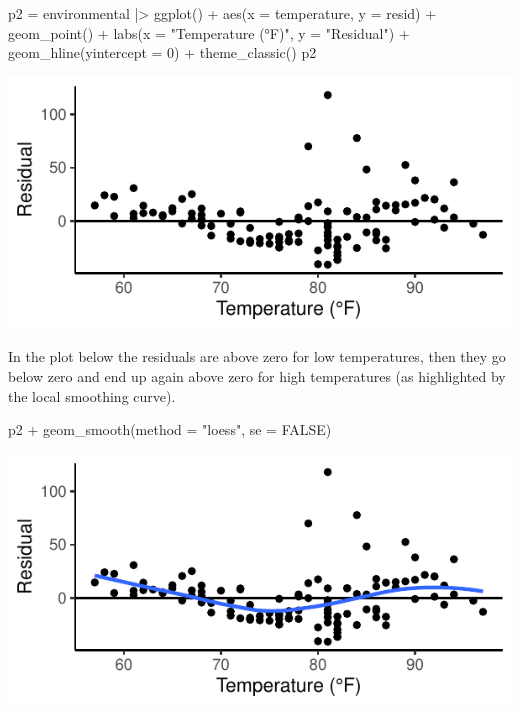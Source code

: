 \documentclass[a4paper]{article}\usepackage[]{graphicx}\usepackage[]{xcolor}
\makeatletter
\def\maxwidth{ %
  \ifdim\Gin@nat@width>\linewidth
    \linewidth
  \else
    \Gin@nat@width
  \fi
}
\makeatother
\begin{document}
\hspace{0.02\textwidth}
\begin{minipage}[t]{0.49\textwidth}
\begin{Schunk}
\begin{Sinput}
p2 = environmental |> ggplot() + 
  aes(x = temperature, y = resid) + 
  geom_point() + 
  labs(x = "Temperature (°F)",
       y = "Residual") +
  geom_hline(yintercept = 0) +
  theme_classic()
p2
\end{Sinput}


{\centering \includegraphics[width=\maxwidth]{figure/listings-unnamed-chunk-344-1} 

}

\end{Schunk}
\end{minipage}
In the plot below the residuals are above zero for low temperatures, then they go below zero and end up again above zero for high temperatures (as highlighted by the local smoothing curve).\\
\begin{minipage}[m]{0.49\textwidth}
\begin{Schunk}
\begin{Sinput}
p2 + geom_smooth(method = "loess", 
                 se = FALSE)
\end{Sinput}


{\centering \includegraphics[width=\maxwidth]{figure/listings-unnamed-chunk-345-1} 

}

\end{Schunk}
\end{minipage}
\end{document}
